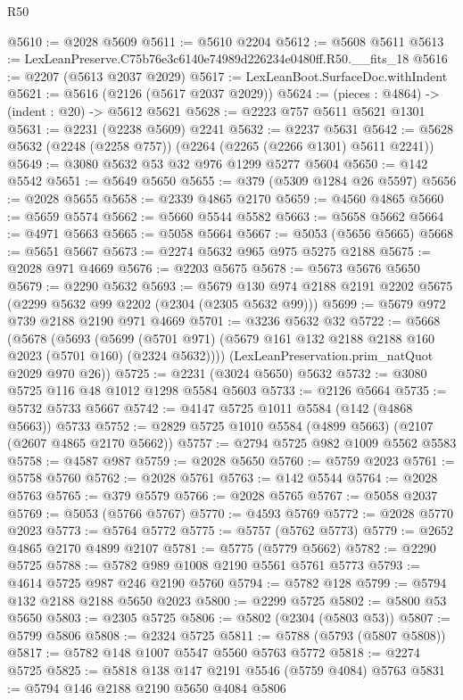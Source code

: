 \begin{lexlean}{R50}
\begin{coremodule}
@5610 := @2028 @5609
@5611 := @5610 @2204
@5612 := @5608 @5611
@5613 := LexLeanPreserve.C75b76e3c6140e74989d226234e0480ff.R50.__fits_18
@5616 := @2207 (@5613 @2037 @2029)
@5617 := LexLeanBoot.SurfaceDoc.withIndent
@5621 := @5616 (@2126 (@5617 @2037 @2029))
@5624 := (pieces : @4864) -> (indent : @20) -> @5612 @5621
@5628 := @2223 @757 @5611 @5621 @1301
@5631 := @2231 (@2238 @5609) @2241
@5632 := @2237 @5631
@5642 := @5628 @5632 (@2248 (@2258 @757)) (@2264 (@2265 (@2266 @1301) @5611 @2241))
@5649 := @3080 @5632 @53 @32 @976 @1299 @5277 @5604
@5650 := @142 @5542
@5651 := @5649 @5650
@5655 := @379 (@5309 @1284 @26 @5597)
@5656 := @2028 @5655
@5658 := @2339 @4865 @2170
@5659 := @4560 @4865
@5660 := @5659 @5574
@5662 := @5660 @5544 @5582
@5663 := @5658 @5662
@5664 := @4971 @5663
@5665 := @5058 @5664
@5667 := @5053 (@5656 @5665)
@5668 := @5651 @5667
@5673 := @2274 @5632 @965 @975 @5275 @2188
@5675 := @2028 @971 @4669
@5676 := @2203 @5675
@5678 := @5673 @5676 @5650
@5679 := @2290 @5632
@5693 := @5679 @130 @974 @2188 @2191 @2202 @5675 (@2299 @5632 @99 @2202 (@2304 (@2305 @5632 @99)))
@5699 := @5679 @972 @739 @2188 @2190 @971 @4669
@5701 := @3236 @5632 @32
@5722 := @5668
    (@5678
      (@5693
        (@5699 (@5701 @971) (@5679 @161 @132 @2188 @2188 @160 @2023 (@5701 @160) (@2324 @5632))))
      (LexLeanPreservation.prim_natQuot @2029 @970 @26))
@5725 := @2231 (@3024 @5650) @5632
@5732 := @3080 @5725 @116 @48 @1012 @1298 @5584 @5603
@5733 := @2126 @5664
@5735 := @5732 @5733 @5667
@5742 := @4147 @5725 @1011 @5584 (@142 (@4868 @5663)) @5733
@5752 := @2829 @5725 @1010 @5584 (@4899 @5663) (@2107 (@2607 @4865 @2170 @5662))
@5757 := @2794 @5725 @982 @1009 @5562 @5583
@5758 := @4587 @987
@5759 := @2028 @5650
@5760 := @5759 @2023
@5761 := @5758 @5760
@5762 := @2028 @5761
@5763 := @142 @5544
@5764 := @2028 @5763
@5765 := @379 @5579
@5766 := @2028 @5765
@5767 := @5058 @2037
@5769 := @5053 (@5766 @5767)
@5770 := @4593 @5769
@5772 := @2028 @5770 @2023
@5773 := @5764 @5772
@5775 := @5757 (@5762 @5773)
@5779 := @2652 @4865 @2170 @4899 @2107
@5781 := @5775 (@5779 @5662)
@5782 := @2290 @5725
@5788 := @5782 @989 @1008 @2190 @5561 @5761 @5773
@5793 := @4614 @5725 @987 @246 @2190 @5760
@5794 := @5782 @128
@5799 := @5794 @132 @2188 @2188 @5650 @2023
@5800 := @2299 @5725
@5802 := @5800 @53 @5650
@5803 := @2305 @5725
@5806 := @5802 (@2304 (@5803 @53))
@5807 := @5799 @5806
@5808 := @2324 @5725
@5811 := @5788 (@5793 (@5807 @5808))
@5817 := @5782 @148 @1007 @5547 @5560 @5763 @5772
@5818 := @2274 @5725
@5825 := @5818 @138 @147 @2191 @5546 (@5759 @4084) @5763
@5831 := @5794 @146 @2188 @2190 @5650 @4084 @5806

\end{coremodule}
\end{lexlean}
